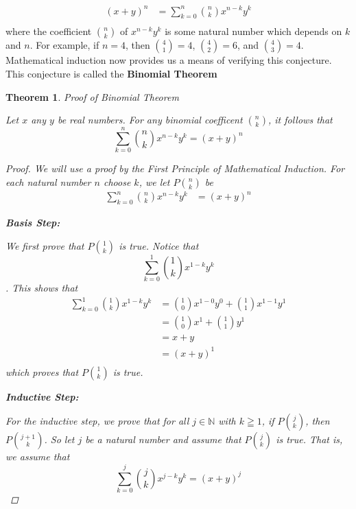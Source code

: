 \documentclass{book}
\newtheorem{theorem}{Theorem}[section]
\theoremstyle{definition}
\theoremstyle{remark}
\newcommand{\bb}[1]{\mathbb{#1}}
\begin{document}
    \begin{align*}
        (x + y)^n & = \sum_{k=0}^{n} \binom{n}{k}x^{n-k}y^k \\
    \end{align*}
where the coefficient $\binom{n}{k}$ of $x^{n-k}y^k$ is some natural number which depends on $k$ and $n$. For example, if $n=4$, then $\binom{4}{1}=4$, $\binom{4}{2}=6$, and $\binom{4}{3}=4$. Mathematical induction now provides us a means of verifying this conjecture. This conjecture is called the \textbf{Binomial Theorem} 

\newpage
\begin{theorem}
Proof of Binomial Theorem

    \begin{tcolorbox}
            Let $x$ any $y$ be real numbers. For any binomial coefficent $\binom{n}{k}$, it follows that
                \begin{equation*}
                    \sum_{k=0}^{n} \binom{n}{k}x^{n-k}y^k = (x + y)^n
                \end{equation*}
    \end{tcolorbox}

    \begin{proof}
        We will use a proof by the First Principle of Mathematical Induction. For each natural number $n$ choose $k$, we let $P\binom{n}{k}$ be
            \begin{align*}
                \sum_{k=0}^{n} \binom{n}{k}x^{n-k}y^k & = (x + y)^n
            \end{align*}
        
        \begin{flushleft} \textbf{Basis Step:} \end{flushleft}
        We first prove that $P\binom{1}{k}$ is true. Notice that $$ \sum_{k=0}^{1} \binom{1}{k}x^{1-k}y^k $$. This shows that   
            \begin{align*}
                \sum_{k=0}^{1} \binom{1}{k}x^{1-k}y^k &= \binom{1}{0}x^{1-0}y^0 + \binom{1}{1}x^{1-1}y^1 \\
                    &= \binom{1}{0}x^1 + \binom{1}{1}y^1 \\
                    &= x + y \\
                    &= (x + y)^1 \\
            \end{align*}
        which proves that $P\binom{1}{k}$ is true. 
        
        
        \begin{flushleft} \textbf{Inductive Step:} \end{flushleft}        
        For the inductive step, we prove that for all $j \in \bb{N}$ with $k \geqq 1$, if $P\binom{j}{k}$, then $P\binom{j+1}{k}$. So let $j$ be a natural number and assume that $P\binom{j}{k}$ is true. That is, we assume that 
            \begin{equation*}
                \sum_{k=0}^{j} \binom{j}{k}x^{j-k}y^k = (x + y)^j
            \end{equation*}
        

\end{proof}
\end{theorem}
\end{document}
